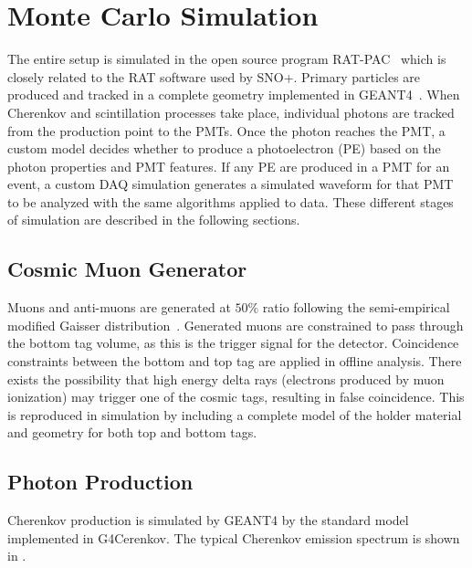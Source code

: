 \section{Monte Carlo Simulation}
\label{sec:simulation}

The entire setup is simulated in the open source program RAT-PAC~\cite{ratpac} which is closely related to the RAT software used by SNO+. 
Primary particles are produced and tracked in a complete geometry implemented in GEANT4~\cite{geant4}. 
When Cherenkov and scintillation processes take place, individual photons are tracked from the production point to the PMTs. 
Once the photon reaches the PMT, a custom model decides whether to produce a photoelectron (PE) based on the photon properties and PMT features. 
If any PE are produced in a PMT for an event, a custom DAQ simulation generates a simulated waveform for that PMT to be analyzed with the same algorithms applied to data.
These different stages of simulation are described in the following sections.

\subsection{Cosmic Muon Generator}
\label{sec:primarygen}

Muons and anti-muons are generated at $50\%$ ratio following the semi-empirical modified Gaisser distribution~\cite{gaisser-mod}. 
Generated muons are constrained to pass through the bottom tag volume, as this is the trigger signal for the detector. 
Coincidence constraints between the bottom and top tag are applied in offline analysis.
There exists the possibility that high energy delta rays (electrons produced by muon ionization) may trigger one of the cosmic tags, resulting in false coincidence.
This is reproduced in simulation by including a complete model of the holder material and geometry for both top and bottom tags.

\subsection{Photon Production \label{sec:photon_prod}}

Cherenkov production is simulated by GEANT4 by the standard model implemented in G4Cerenkov. 
The typical Cherenkov emission spectrum is shown in .

